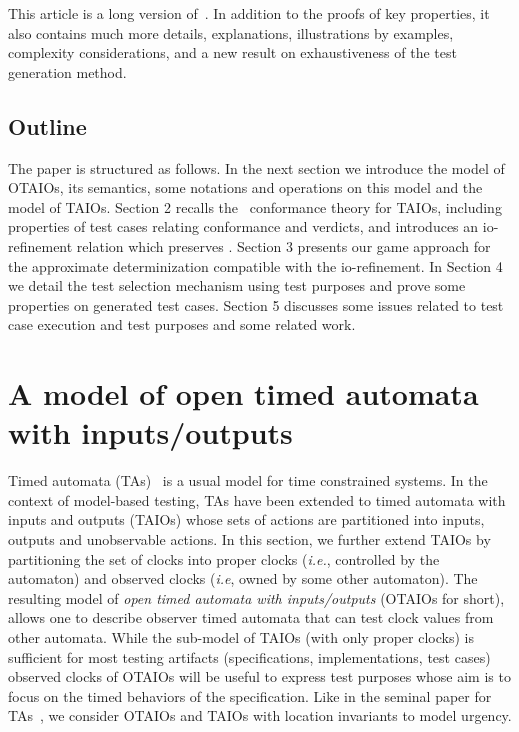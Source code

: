 \documentclass{LMCS}
\theoremstyle{plain}\newtheorem{proposition}[thm]{Proposition}
\begin{document}
This article is a long version
of~\cite{BertrandJeronStainerKrichen-TACASS2011}. In addition to the
proofs of key properties, it also contains much more details,
explanations, illustrations by examples, complexity considerations,
and a new result on exhaustiveness of the test generation method.

\subsection*{Outline}
The paper is structured as follows. In the next section we introduce
the model of OTAIOs, its semantics, some notations and operations on this model
and the model of TAIOs.
Section 2 recalls the \tioco\, conformance theory for TAIOs, including 
properties of test cases 
relating conformance and verdicts, and introduces an io-refinement
relation which preserves \tioco. Section 3 presents our game approach for
the approximate determinization compatible with the io-refinement.  In
Section 4 we detail the test selection mechanism using test purposes
and prove some properties on generated test cases.
Section 5 discusses some issues related to test case execution 
and test purposes and some related work.


\section{A model of  open timed automata with inputs/outputs}
Timed automata (TAs)~\cite{AlurDill94} is 
a usual model for time constrained systems.
In the context of model-based testing, TAs have been extended 
to timed automata with inputs and outputs (TAIOs) 
whose sets of actions are partitioned into 
inputs, outputs and unobservable actions.
In this section, we further extend TAIOs by partitioning the set of clocks into proper clocks (\emph{i.e.},
controlled by the automaton) and observed clocks (\emph{i.e}, owned by
some other automaton).  
The resulting model of {\em open timed
    automata with inputs/outputs} (OTAIOs for short), allows one to
  describe observer timed automata that can test clock values from
  other automata.
While the sub-model of TAIOs (with only proper
clocks) is sufficient for most testing artifacts (specifications,
implementations, test cases) observed clocks of OTAIOs will be useful
to express test purposes whose aim is to focus on the timed behaviors
of the specification.  Like in the seminal paper for
TAs~\cite{AlurDill94}, we consider OTAIOs and TAIOs with location
invariants to model urgency.
\end{document}

